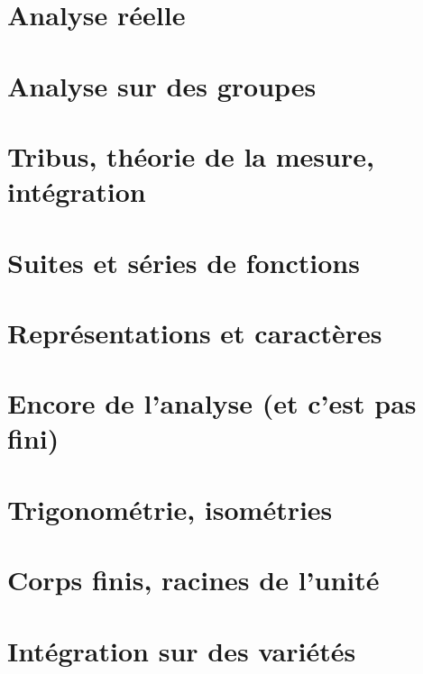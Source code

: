\documentclass[a4paper,twoside,11pt]{book}
\begin{document}
\chapter{Analyse réelle}








\chapter{Analyse sur des groupes}


\chapter{Tribus, théorie de la mesure, intégration}






\chapter{Suites et séries de fonctions}





\chapter{Représentations et caractères}


\chapter{Encore de l'analyse (et c'est pas fini)}





\chapter{Trigonométrie, isométries}






\chapter{Corps finis, racines de l'unité}


\chapter{Intégration sur des variétés}





\end{document}
